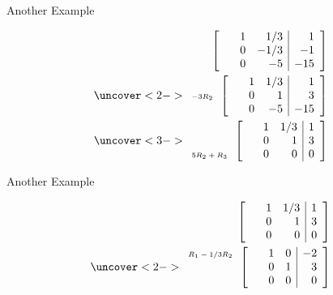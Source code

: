 \begin{frame}{Another Example}

  \begin{eqnarray*}
    \stateThree{~}{~}{~}
    \startRowOps
      \oneRowOps{~}{1}{1/3}{1}
      \oneRowOps{~}{0}{-1/3}{-1}
      \oneRowOps{~}{0}{-5}{-15}
    \stopRowOps
    \\
    \uncover<2->{%
      \stateThree{~}{-3R_2}{~}
      \startRowOps
      \oneRowOps{~}{1}{1/3}{1}
      \oneRowOps{~}{0}{1}{3}
      \oneRowOps{~}{0}{-5}{-15}
      \stopRowOps
    }
    \\
    \uncover<3->{%
      \stateThree{~}{~}{5R_2+R_3}
      \startRowOps
      \oneRowOps{~}{1}{1/3}{1}
      \oneRowOps{~}{0}{1}{3}
      \oneRowOps{~}{0}{0}{0}
      \stopRowOps
    }
  \end{eqnarray*}

  
\end{frame}


\begin{frame}{Another Example}

  \begin{eqnarray*}
    \stateThree{~}{~}{~}
    \startRowOps
      \oneRowOps{~}{1}{1/3}{1}
      \oneRowOps{~}{0}{1}{3}
      \oneRowOps{~}{0}{0}{0}
    \stopRowOps
    \\
    \uncover<2->{%
      \stateThree{R_1-1/3R_2}{~}{~}
      \startRowOps
      \oneRowOps{~}{1}{0}{-2}
      \oneRowOps{~}{0}{1}{3}
      \oneRowOps{~}{0}{0}{0}
      \stopRowOps
    }
  \end{eqnarray*}


  
\end{frame}



